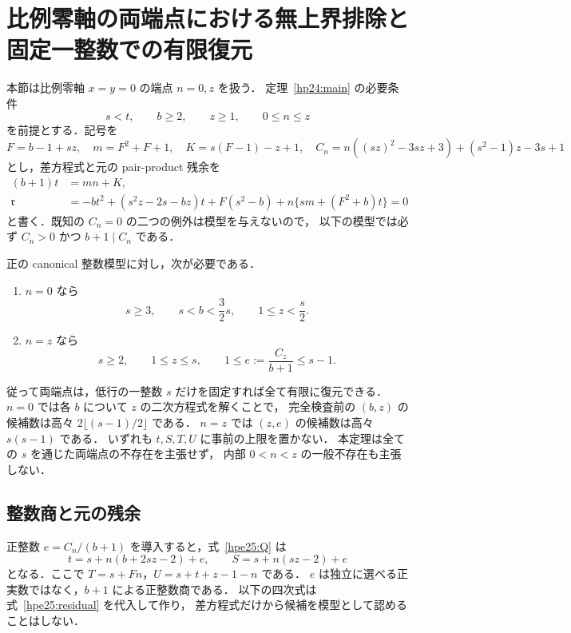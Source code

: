 \section{比例零軸の両端点における無上界排除と固定一整数での有限復元}
\label{hpe25:section}

本節は比例零軸 $x=y=0$ の端点 $n=0,z$ を扱う．
定理~\ref{hp24:main} の必要条件
\[
 s<t,\qquad b\ge2,\qquad z\ge1,\qquad 0\le n\le z
\]
を前提とする．記号を
\[
 F=b-1+sz,\quad m=F^2+F+1,\quad K=s(F-1)-z+1,\quad
 C_n=n((sz)^2-3sz+3)+(s^2-1)z-3s+1
\]
とし，差方程式と元の pair-product 残余を
\begin{align}
 (b+1)t&=mn+K,\label{hpe25:Q}\\
 \mathfrak r&=-bt^2+(s^2z-2s-bz)t+F(s^2-b)
 +n\{sm+(F^2+b)t\}=0\label{hpe25:residual}
\end{align}
と書く．既知の $C_n=0$ の二つの例外は模型を与えないので，
以下の模型では必ず $C_n>0$ かつ $b+1\mid C_n$ である．

\begin{theorem}[比例零軸の端点有限化]\label{hpe25:main}
正の canonical 整数模型に対し，次が必要である．
\begin{enumerate}
\item $n=0$ なら
\[
 s\ge3,\qquad s<b<\frac32s,\qquad 1\le z<\frac s2.
\]
\item $n=z$ なら
\[
 s\ge2,\qquad 1\le z\le s,\qquad
 1\le e:=\frac{C_z}{b+1}\le s-1.
\]
\end{enumerate}
従って両端点は，低行の一整数 $s$ だけを固定すれば全て有限に復元できる．
$n=0$ では各 $b$ について $z$ の二次方程式を解くことで，
完全検査前の $(b,z)$ の候補数は高々
$2\lfloor(s-1)/2\rfloor$ である．
$n=z$ では $(z,e)$ の候補数は高々 $s(s-1)$ である．
いずれも $t,S,T,U$ に事前の上限を置かない．
本定理は全ての $s$ を通じた両端点の不存在を主張せず，
内部 $0<n<z$ の一般不存在も主張しない．
\end{theorem}

\subsection{整数商と元の残余}

正整数 $e=C_n/(b+1)$ を導入すると，式~\eqref{hpe25:Q} は
\begin{equation}\label{hpe25:e-coordinates}
 t=s+n(b+2sz-2)+e,\qquad S=s+n(sz-2)+e
\end{equation}
となる．ここで $T=s+Fn$，$U=s+t+z-1-n$ である．
$e$ は独立に選べる正実数ではなく，$b+1$ による正整数商である．
以下の四次式は式~\eqref{hpe25:residual} を代入して作り，
差方程式だけから候補を模型として認めることはしない．

